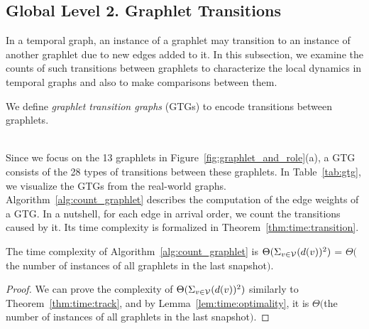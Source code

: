 \subsection{Global Level 2. Graphlet Transitions}
\label{section:graph:transition}

In a temporal graph, an instance of a graphlet may transition to an instance of another graphlet due to new edges added to it.
In this subsection, we examine the counts of such transitions between graphlets to characterize the local dynamics in temporal graphs and also to make comparisons between them.

We define \textit{graphlet transition graphs} (GTGs) to encode transitions between graphlets.

\noindent{}
\vspace{0.5mm}
\\
\noindent Since we focus on the 13 graphlets in Figure~\ref{fig:graphlet_and_role}(a), a GTG consists of the 28 types of transitions between these graphlets.
In Table~\ref{tab:gtg}, we visualize the GTGs from the real-world graphs.
Algorithm~\ref{alg:count_graphlet} describes the computation of the edge weights of 
 a GTG. In a nutshell, for each edge in arrival order, we count the transitions caused by it.
Its time complexity is formalized in Theorem~\ref{thm:time:transition}.

\begin{theorem} \label{thm:time:transition} 
The time complexity of Algorithm~\ref{alg:count_graphlet} is $\Theta(\Sigma_{v\in\mathcal{V}}(d(v))^2)$ = $\Theta($the number of instances of all graphlets in the last snapshot$)$.
\end{theorem}
\begin{proof}
We can prove the complexity of $\Theta(\Sigma_{v\in\mathcal{V}}(d(v))^2)$ similarly to Theorem~\ref{thm:time:track}, and by Lemma~\ref{lem:time:optimality}, it is $\Theta($the number of instances of all graphlets in the last snapshot$)$.
\end{proof}


